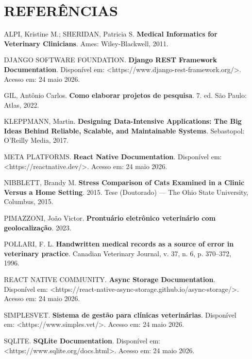 \chapter*{REFERÊNCIAS}

ALPI, Kristine M.; SHERIDAN, Patricia S. \textbf{Medical Informatics for Veterinary Clinicians}. Ames: Wiley-Blackwell, 2011.

DJANGO SOFTWARE FOUNDATION. \textbf{Django REST Framework Documentation}. Disponível em: <https://www.django-rest-framework.org/>. Acesso em: 24 maio 2026.

GIL, Antônio Carlos. \textbf{Como elaborar projetos de pesquisa}. 7. ed. São Paulo: Atlas, 2022.

KLEPPMANN, Martin. \textbf{Designing Data-Intensive Applications: The Big Ideas Behind Reliable, Scalable, and Maintainable Systems}. Sebastopol: O'Reilly Media, 2017.

META PLATFORMS. \textbf{React Native Documentation}. Disponível em: <https://reactnative.dev/>. Acesso em: 24 maio 2026.

NIBBLETT, Brandy M. \textbf{Stress Comparison of Cats Examined in a Clinic Versus a Home Setting}. 2015. Tese (Doutorado) --- The Ohio State University, Columbus, 2015.

PIMAZZONI, João Victor. \textbf{Prontuário eletrônico veterinário com geolocalização}. 2023.

POLLARI, F. L. \textbf{Handwritten medical records as a source of error in veterinary practice}. Canadian Veterinary Journal, v. 37, n. 6, p. 370--372, 1996.

REACT NATIVE COMMUNITY. \textbf{Async Storage Documentation}. Disponível em: <https://react-native-async-storage.github.io/async-storage/>. Acesso em: 24 maio 2026.

SIMPLESVET. \textbf{Sistema de gestão para clínicas veterinárias}. Disponível em: <https://www.simples.vet/>. Acesso em: 24 maio 2026.

SQLITE. \textbf{SQLite Documentation}. Disponível em: <https://www.sqlite.org/docs.html>. Acesso em: 24 maio 2026.
